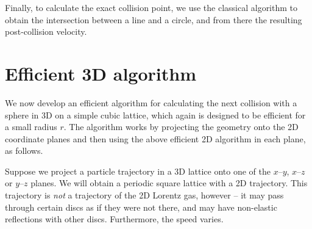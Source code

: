 \documentclass[pre,amsmath,amssymb, twocolumn, showpacs]{revtex4-1}
\begin{document}
%

Finally, to calculate the exact collision point, we use the classical algorithm to obtain the intersection between a line and a circle, and from there the resulting post-collision velocity.

\section{Efficient 3D algorithm}

We now develop an efficient algorithm for calculating the next collision with a sphere in 3D on a simple cubic lattice, which again is designed to be efficient for a small radius $r$. The algorithm works by projecting the geometry onto the 2D coordinate planes and then using the above efficient 2D algorithm in each plane, as follows.

Suppose we project a particle trajectory in a 3D lattice onto one of the $x$--$y$, $x$--$z$ or 
$y$--$z$ planes. We will obtain a periodic square lattice with a 2D trajectory. This trajectory is \emph{not} a trajectory of the 2D Lorentz gas, however -- it may pass through certain discs as if they were not there, and may have non-elastic reflections with other discs. Furthermore, the speed varies.
\end{document}
